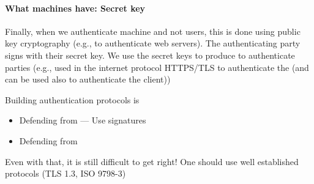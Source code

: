 \paragraph{What machines have: Secret key}%
\label{par:What machines have: Secret key}
Finally, when we authenticate machine and not users, this is done using public key cryptography (e.g., to authenticate web servers). The authenticating party signs with their secret key. We use the secret keys to produce  to authenticate parties (e.g., used in the internet protocol HTTPS/TLS to authenticate the  (and can be used also to authenticate the client))
\begin{framedremark}
Building authentication protocols is 
\begin{itemize}
    \item Defending from  --- Use signatures
    \item Defending from 
\end{itemize}
Even with that, it is still difficult to get right! One should use well established protocols (TLS 1.3, ISO 9798-3)
\end{framedremark}









